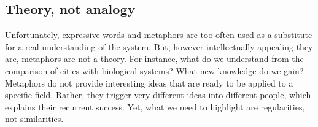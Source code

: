 



\subsection{Theory, not analogy}
\label{sub:theory_not_analogy}

Unfortunately, expressive words and metaphors are too often used as a substitute
for a real understanding of the system. But, however intellectually appealing
they are, metaphors are not a theory. For instance, what do we understand from
the comparison of cities with biological systems? What new knowledge do we gain?
Metaphors do not provide interesting ideas that are ready to be applied to a
specific field. Rather, they trigger very different ideas into different people,
which explains their recurrent success. Yet, what we need to highlight are
regularities, not similarities.\\

